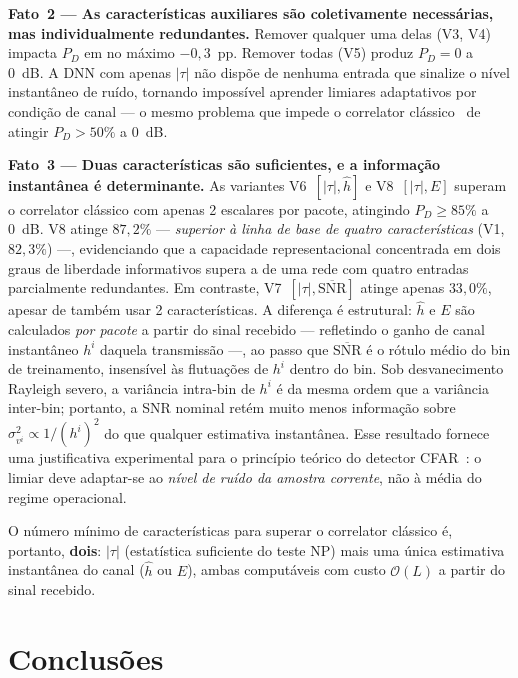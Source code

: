 \documentclass{sbrt}
\begin{document}
\textbf{Fato~2 — As características auxiliares são coletivamente necessárias, mas individualmente redundantes.} Remover qualquer uma delas (V3, V4) impacta $P_D$ em no máximo $-0{,}3$~pp. Remover todas (V5) produz $P_D = 0$ a 0~dB. A DNN com apenas $|\tau|$ não dispõe de nenhuma entrada que sinalize o nível instantâneo de ruído, tornando impossível aprender limiares adaptativos por condição de canal — o mesmo problema que impede o correlator clássico~\cite{ref_xie} de atingir $P_D > 50\%$ a 0~dB.

\textbf{Fato~3 — Duas características são suficientes, e a informação instantânea é determinante.} As variantes V6~$[|\tau|, \hat{h}]$ e V8~$[|\tau|, E]$ superam o correlator clássico com apenas 2 escalares por pacote, atingindo $P_D \geq 85\%$ a 0~dB. V8 atinge $87{,}2\%$ — \emph{superior à linha de base de quatro características} (V1, $82{,}3\%$) —, evidenciando que a capacidade representacional concentrada em dois graus de liberdade informativos supera a de uma rede com quatro entradas parcialmente redundantes. Em contraste, V7~$[|\tau|, \overline{\text{SNR}}]$ atinge apenas $33{,}0\%$, apesar de também usar 2 características. A diferença é estrutural: $\hat{h}$ e $E$ são calculados \emph{por pacote} a partir do sinal recebido — refletindo o ganho de canal instantâneo $h^i$ daquela transmissão —, ao passo que $\overline{\text{SNR}}$ é o rótulo médio do bin de treinamento, insensível às flutuações de $h^i$ dentro do bin. Sob desvanecimento Rayleigh severo, a variância intra-bin de $h^i$ é da mesma ordem que a variância inter-bin; portanto, a SNR nominal retém muito menos informação sobre $\sigma_{v^i}^2 \propto 1/(h^i)^2$ do que qualquer estimativa instantânea. Esse resultado fornece uma justificativa experimental para o princípio teórico do detector CFAR~\cite{ref_poor}: o limiar deve adaptar-se ao \emph{nível de ruído da amostra corrente}, não à média do regime operacional.

O número mínimo de características para superar o correlator clássico é, portanto, \textbf{dois}: $|\tau|$ (estatística suficiente do teste NP) mais uma única estimativa instantânea do canal ($\hat{h}$ ou $E$), ambas computáveis com custo $\mathcal{O}(L)$ a partir do sinal recebido.


\section{Conclusões}
\end{document}
